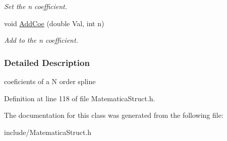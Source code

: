 \begin{DoxyCompactItemize}
\begin{DoxyCompactList}\small\item\em \-Set the n coefficient. \end{DoxyCompactList}\item 
\hypertarget{classSpline_aeda17df26c0620cbf9e634c00de774df}{void \hyperlink{classSpline_aeda17df26c0620cbf9e634c00de774df}{\-Add\-Coe} (double \-Val, int n)}\label{classSpline_aeda17df26c0620cbf9e634c00de774df}

\begin{DoxyCompactList}\small\item\em \-Add to the n coefficient. \end{DoxyCompactList}\end{DoxyCompactItemize}


\subsubsection{\-Detailed \-Description}
coeficients of a \-N order spline 

\-Definition at line 118 of file \-Matematica\-Struct.\-h.



\-The documentation for this class was generated from the following file\-:\begin{DoxyCompactItemize}
\item 
include/\-Matematica\-Struct.\-h\end{DoxyCompactItemize}
